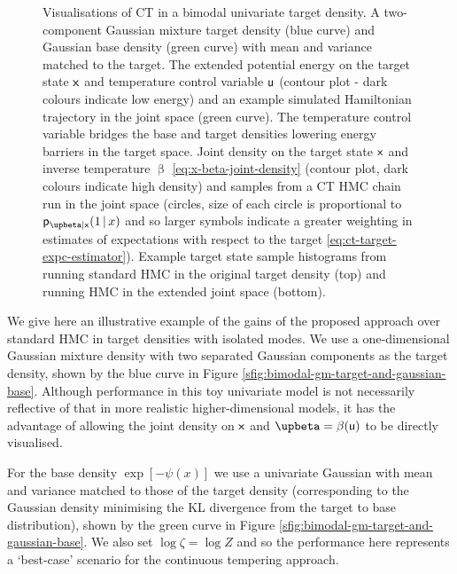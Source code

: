 \begin{figure}[!t]
\caption{Visualisations of \ac{CT} in a bimodal univariate target density.  A two-component Gaussian mixture target density (blue curve) and Gaussian base density (green curve) with mean and variance matched to the target.  The extended potential energy on the target state $\mathsf{x}$ and temperature control variable $\mathsf{u}$ (contour plot - dark colours indicate low energy) and an example simulated Hamiltonian trajectory in the joint space (green curve). The temperature control variable bridges the base and target densities lowering energy barriers in the target space.  Joint density on the target state $\mathsf{x}$ and inverse temperature $\upbeta$ \eqref{eq:x-beta-joint-density} (contour plot, dark colours indicate high density) and samples from a \ac{CT} \ac{HMC} chain run in the joint space (circles, size of each circle is proportional to $\pden{\upbeta|\rvar{x}}(1\gvn x)$ and so larger symbols indicate a greater weighting in estimates of expectations with respect to the target \eqref{eq:ct-target-expc-estimator}).  Example target state sample histograms from running standard \ac{HMC} in the original target density (top) and running \ac{HMC} in the extended joint space (bottom).
}
\label{fig:1d-gm-vis}
\end{figure}

We give here an illustrative example of the gains of the proposed approach over standard \ac{HMC} in target densities with isolated modes. We use a one-dimensional Gaussian mixture density with two separated Gaussian components as the target density, shown by the blue curve in Figure \ref{sfig:bimodal-gm-target-and-gaussian-base}. Although performance in this toy univariate model is not necessarily reflective of that in more realistic higher-dimensional models, it has the advantage of allowing the joint density on $\mathsf{x}$ and  $\upbeta = \beta(\rvar{u})$ to be directly visualised.

For the base density $\exp[-\psi(x)]$ we use a univariate Gaussian with mean and variance matched to those of the target density (corresponding to the Gaussian density minimising the \ac{KL} divergence from the target to base distribution), shown by the green curve in Figure \ref{sfig:bimodal-gm-target-and-gaussian-base}. We also set $\log \zeta = \log Z$ and so the performance here represents a `best-case' scenario for the continuous tempering approach.


